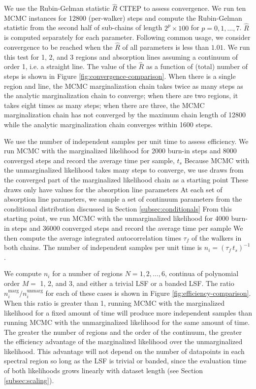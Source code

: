 \documentclass[manuscript]{aastex62}
\begin{document}
We use the Rubin-Gelman statistic $\hat{R}$ CITEP to assess convergence.
We run ten MCMC instances for 12800 (per-walker) steps and compute the Rubin-Gelman statistic from the second half of sub-chains of length $2^p \times 100$ for $p=0, 1, \ldots, 7$.
$\hat{R}$ is computed separately for each parameter.
Following common usage, we consider convergence to be reached when the $\hat{R}$ of all parameters is less than $1.01$.
We run this test for 1, 2, and 3 regions and absorption lines assuming a continuum of order 1, i.e. a straight line.
The value of the $\hat{R}$ as a function of (total) number of steps is shown in Figure \ref{fig:convergence-comparison}.
When there is a single region and line, the MCMC marginalization chain takes twice as many steps as the analytic marginalization chain to converge; when there are two regions, it takes eight times as many steps; when there are three, the MCMC marginalization  chain has not converged by the maximum chain length of 12800 while the analytic marginalization chain converges within 1600 steps.

We use the number of independent samples per unit time to assess efficiency.
We run MCMC with the marginalized likelihood for 2000 burn-in steps and 8000 converged steps and record the average time per sample, $t_s$
Because MCMC with the unmarginalized likelihood takes many steps to converge, we use draws from the converged part of the marginalized likelihood chain as a starting point
These draws only have values for the absorption line parameters
At each set of absorption line parameters, we sample a set of continuum parameters from the conditional distribution discussed in Section \ref{subsec:conditionals}
From this starting point, we run MCMC with the unmarginalized likelihood for 4000 burn-in steps and 36000 converged steps and record the average time per sample
We then compute the average integrated autocorrelation times $\tau_f$ of the walkers in both chains.
The number of independent samples per unit time is $n_i = \left(\tau_f \, t_s \right)^{-1}$.

We compute $n_i$ for a number of regions $N = 1, 2, \ldots, 6$, continua of polynomial order $M=$ 1, 2, and 3, and either a trivial LSF or a banded LSF.
The ratio $n_i^{\text{marg}} / n_i^{\text{unmarg}}$ for each of these cases is shown in Figure \ref{fig:efficiency-comparison}.
When this ratio is greater than 1, running MCMC with the marginalized likelihood for a fixed amount of time will produce more independent samples than running MCMC with the unmarginalized likelihood for the same amount of time.
The greater the number of regions and the order of the continuum, the greater the efficiency advantage of the marginalized likelihood over the unmarginalized likelihood.
This advantage will not depend on the number of datapoints in each spectral region so long as the LSF is trivial or banded, since the evaluation time of both likelihoods grows linearly with dataset length (see Section \ref{subsec:scaling}).
\end{document}
